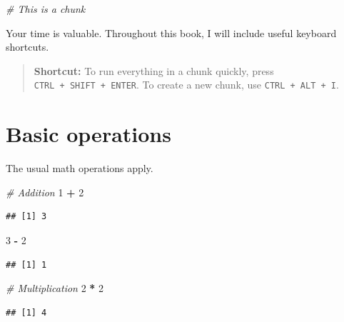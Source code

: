 \documentclass[
  openany]{book}
\newenvironment{Shaded}{\begin{snugshade}}{\end{snugshade}}
\newcommand{\CommentTok}[1]{\textcolor[rgb]{0.56,0.35,0.01}{\textit{#1}}}
\newcommand{\DecValTok}[1]{\textcolor[rgb]{0.00,0.00,0.81}{#1}}
\newcommand{\OperatorTok}[1]{\textcolor[rgb]{0.81,0.36,0.00}{\textbf{#1}}}
\newcommand{\StringTok}[1]{\textcolor[rgb]{0.31,0.60,0.02}{#1}}
\begin{document}
\begin{Shaded}
\begin{Highlighting}[]
\CommentTok{# This is a chunk}
\end{Highlighting}
\end{Shaded}

Your time is valuable. Throughout this book, I will include useful keyboard shortcuts.

\begin{quote}
\textbf{Shortcut:} To run everything in a chunk quickly, press \texttt{CTRL\ +\ SHIFT\ +\ ENTER}.
To create a new chunk, use \texttt{CTRL\ +\ ALT\ +\ I}.
\end{quote}

\hypertarget{basic-operations}{%
\section{Basic operations}\label{basic-operations}}

The usual math operations apply.

\begin{Shaded}
\begin{Highlighting}[]
\CommentTok{# Addition}
\DecValTok{1} \OperatorTok{+}\StringTok{ }\DecValTok{2} 
\end{Highlighting}
\end{Shaded}

\begin{verbatim}
## [1] 3
\end{verbatim}

\begin{Shaded}
\begin{Highlighting}[]
\DecValTok{3} \OperatorTok{-}\StringTok{ }\DecValTok{2}
\end{Highlighting}
\end{Shaded}

\begin{verbatim}
## [1] 1
\end{verbatim}

\begin{Shaded}
\begin{Highlighting}[]
\CommentTok{# Multiplication}
\DecValTok{2} \OperatorTok{*}\StringTok{ }\DecValTok{2}
\end{Highlighting}
\end{Shaded}

\begin{verbatim}
## [1] 4
\end{verbatim}
\end{document}
